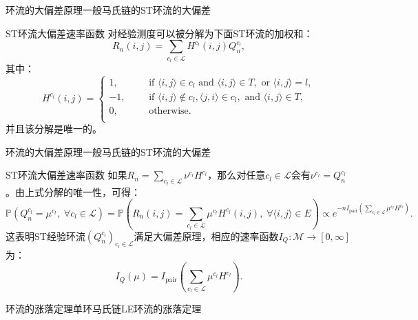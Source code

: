 \documentclass{beamer}
\begin{document}
\begin{frame}{环流的大偏差原理}{一般马氏链的ST环流的大偏差}
	\begin{block}{ST环流大偏差速率函数}
		对经验测度可以被分解为下面ST环流的加权和：
		\begin{equation*}
			R_n(i,j) = \sum_{c_l\in\mathcal{L}}H^{c_l}(i,j)Q^{c_l}_n,
		\end{equation*}
		其中：
		\begin{equation*}\label{cycle function2}
			H^{c_l}(i,j)
			=\left\{\begin{aligned}
				1,  &  &  & \text{if } \langle i,j\rangle \in c_l \text{ and }\langle i,j\rangle \in T, \text{ or } \langle i,j\rangle=l, \\
				-1, &  &  & \text{if } \langle i,j\rangle\notin c_l,\langle j,i\rangle \in c_l,\text{ and }\langle i,j\rangle \in T,      \\
				0,  &  &  & \text{otherwise}.                                                                                             \\
			\end{aligned}\right.
		\end{equation*}
		并且该分解是唯一的。
	\end{block}
\end{frame}

\begin{frame}{环流的大偏差原理}{一般马氏链的ST环流的大偏差}
	\begin{block}{ST环流大偏差速率函数}
		如果$R_n =\sum_{c_l \in \mathcal{L}}\nu^{c_l}H^{c_l}$，那么对任意$c_l \in \mathcal{L}$会有$\nu^{c_l}=Q_n^{c_l}$。由上式分解的唯一性，可得：
		{\footnotesize
		\begin{equation*}
			\mathbb{P}(Q_n^{c_l}=\mu^{c_l},\;\forall c_l\in\mathcal{L})
			=\mathbb{P}\left(R_n(i,j)=\sum_{c_l\in\mathcal{L}}\mu^{c_l}H^{c_l}(i,j),\;\forall\langle i,j\rangle\in E\right)
			\propto e^{-n I_{\mathrm{pair}}\left(\sum_{c_l\in\mathcal{L}}\mu^{c_l}H^{c_l}\right)}.
		\end{equation*}}
		这表明ST经验环流$(Q_n^{c_l})_{c_l\in\mathcal{L}}$满足大偏差原理，相应的速率函数$I_Q:\mathcal{M}\rightarrow[0,\infty]$为：
		\begin{equation*}\label{formula:I_Q}
			I_Q(\mu)=I_{\mathrm{pair}}\left(\sum_{c_l\in\mathcal{L}}\mu^{c_l}H^{c_l}\right).
		\end{equation*}
	\end{block}
\end{frame}

\begin{frame}{环流的涨落定理}{单环马氏链LE环流的涨落定理}

	
\end{frame}
\end{document}
